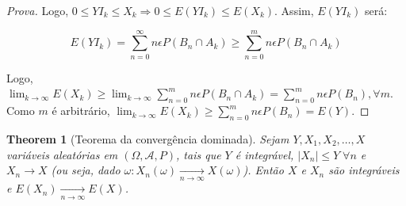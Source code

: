 \documentclass[
]{article}
\newtheorem{theorem}{Theorem}[section]
\theoremstyle{definition}
\theoremstyle{definition}
\theoremstyle{definition}
\theoremstyle{definition}
\theoremstyle{remark}
\begin{document}
\begin{proof}[Prova]
Logo, \(0 \le YI_{k} \le X_{k} \Rightarrow 0 \le E(YI_{k}) \le E(X_{k})\). Assim, \(E(YI_{k})\) será:

\begin{equation*}
E(YI_{k}) = \sum_{n=0}^{\infty}n\epsilon P(B_{n} \cap A_{k}) \ge \sum_{n=0}^{m}n\epsilon P(B_{n} \cap A_{k})
\end{equation*}

Logo, \(\lim_{k \to \infty}E(X_{k}) \ge \lim_{k \to \infty} \sum_{n=0}^{m}n\epsilon P(B_{n} \cap A_{k}) = \sum_{n=0}^{m}n\epsilon P(B_{n}), \forall m\). Como \(m\) é arbitrário, \(\lim_{k \to \infty}E(X_{k}) \ge \sum_{n=0}^{m}n\epsilon P(B_{n}) = E(Y)\).
\end{proof}

\begin{theorem}[Teorema da convergência dominada]
Sejam \(Y,X_{1},X_{2},\ldots,X\) variáveis aleatórias em \((\Omega, \mathcal{A},P)\), tais que \(Y\) é integrável, \(|X_{n}| \le Y \; \forall n\) e \(X_{n} \to X\) (ou seja, dado \(\omega: X_{n}(\omega) \xrightarrow[n \to \infty]{}X(\omega)\)). Então \(X\) e \(X_{n}\) são integráveis e \(E(X_{n}) \xrightarrow[n \to \infty]{}E(X)\).
\end{theorem}
\end{document}
